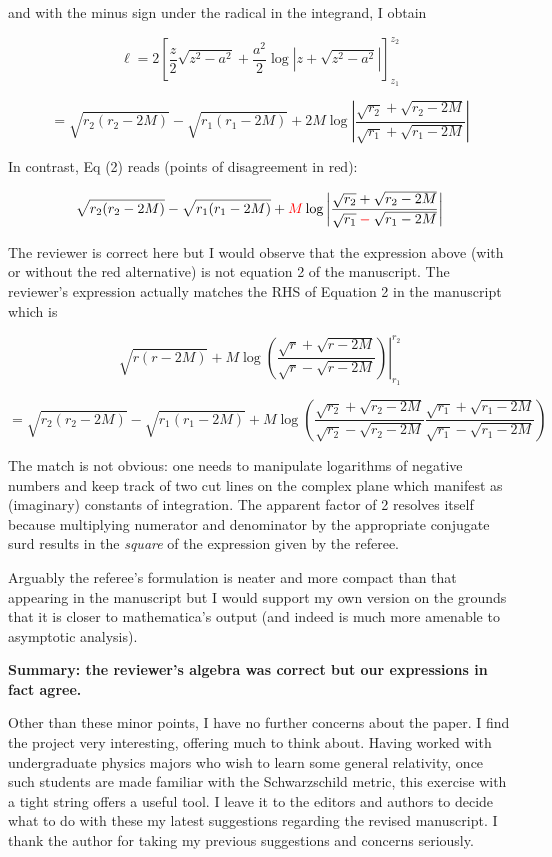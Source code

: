 \documentclass[12pt]{article}
\begin{document}
 and with the minus sign under the radical in the integrand, I obtain

\[
\ell = 2\left[
  \frac{z}{2}\sqrt{z^2-a^2} + \frac{a^2}{2}\log\left|z+\sqrt{z^2-a^2}\right|
  \right]_{z_1}^{z_2}
\]

\[
=
\sqrt{r_2(r_2-2M)}-\sqrt{r_1(r_1-2M)} + 2M\log\left|
\frac{\sqrt{r_2}+\sqrt{r_2-2M}}{\sqrt{r_1}+\sqrt{r_1-2M}}\right|
\]


In contrast, Eq (2) reads (points of disagreement in red):


\[
\sqrt{r_2(r_2-2M)}-\sqrt{r_1(r_1-2M)} 
+\color{red}M
\color{black}\log\left|
\frac{\sqrt{r_2}+\sqrt{r_2-2M}}{\sqrt{r_1}
  \color{red}-
  \color{black}\sqrt{r_1-2M}}\right|
\]

{\color{blue} The reviewer is correct here but I would observe that
  the expression above (with or without the red alternative) is not
  equation 2 of the manuscript.  The reviewer's expression actually
  matches the RHS of Equation 2 in the manuscript which is

  \[
  \left.
  \sqrt{r(r-2M)} +M\log\left(
  \frac{\sqrt{r}+\sqrt{r-2M}}{\sqrt{r}-\sqrt{r-2M}}\right)
  \right|_{r_1}^{r_2}
  \]

  \[
  = 
  \sqrt{r_2(r_2-2M)}-  \sqrt{r_1(r_1-2M)}
 +M\log\left(
 \frac{\sqrt{r_2}+\sqrt{r_2-2M}}{\sqrt{r_2}-\sqrt{r_2-2M}}
 \frac{\sqrt{r_1}+\sqrt{r_1-2M}}{\sqrt{r_1}-\sqrt{r_1-2M}}
 \right)
  \]

The match is not obvious: one needs to manipulate logarithms of
negative numbers and keep track of two cut lines on the complex plane
which manifest as (imaginary) constants of integration.  The apparent
factor of 2 resolves itself because multiplying numerator and
denominator by the appropriate conjugate surd results in the {\em
  square} of the expression given by the referee.

Arguably the referee's formulation is neater and more compact than
that appearing in the manuscript but I would support my own version on
the grounds that it is closer to mathematica's output (and indeed is
much more amenable to asymptotic analysis).

{\bf Summary: the reviewer's algebra was correct but our expressions
  in fact agree.}
}

Other than these minor points, I have no further concerns about the
paper. I find the project very interesting, offering much to think
about. Having worked with undergraduate physics majors who wish to
learn some general relativity, once such students are made familiar
with the Schwarzschild metric, this exercise with a tight string
offers a useful tool. I leave it to the editors and authors to decide
what to do with these my latest suggestions regarding the revised
manuscript. I thank the author for taking my previous suggestions and
concerns seriously.
\end{document}
